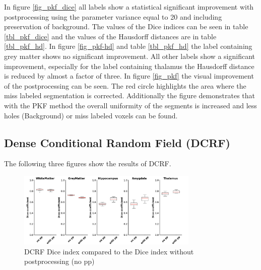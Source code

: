 \documentclass[journal]{IEEEtran}
\begin{document}
In figure \ref{fig_pkf_dice} all labels show a statistical significant improvement with postprocessing using the parameter variance equal to 20 and including preservation of background. The values of the Dice indices can be seen in table \ref{tbl_pkf_dice} and the values of the Hausdorff distances are in table \ref{tbl_pkf_hd}.
In figure \ref{fig_pkf-hd} and table \ref{tbl_pkf_hd} the label containing grey matter shows no significant improvement. All other labels show a significant improvement, especially for the label containing thalamus the Hausdorff distance is reduced by almost a factor of three.
In figure \ref{fig_pkf} the visual improvement of the postprocessing can be seen. The red circle highlights the area where the miss labeled segmentation is corrected. Additionally the figure demonstrates that with the PKF method the overall uniformity of the segments is increased and less holes (Background) or miss labeled voxels can be found.

\subsection{Dense Conditional Random Field (DCRF)}
The following three figures show the results of DCRF.
\begin{figure}[ht]
\centering
\includegraphics[width=3.4in]{MIALab_Report/img/boxplots/DCRF-DICE.png}
\caption{DCRF Dice index compared to the Dice index without postprocessing (no pp)}
\label{fig_dcrf_dice}
\end{figure}
\end{document}
